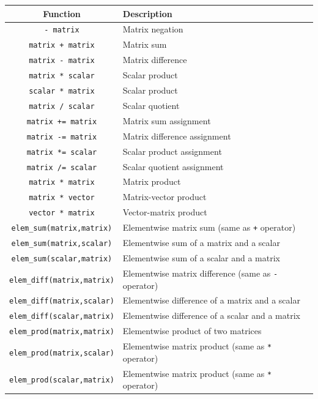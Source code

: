 \begin{table}[t!]\begin{centering}
\begin{tabular}{|c|l|} \hline
Function & Description \\ \hline \hline
\verb#- matrix# & Matrix negation \\ \hline
\verb#matrix + matrix# & Matrix sum \\ \hline
\verb#matrix - matrix# & Matrix difference \\ \hline
\verb#matrix * scalar# & Scalar product \\ \hline
\verb#scalar * matrix# & Scalar product \\ \hline
\verb#matrix / scalar# & Scalar quotient \\ \hline
\verb#matrix += matrix# & Matrix sum assignment \\ \hline
\verb#matrix -= matrix# & Matrix difference assignment \\ \hline
\verb#matrix *= scalar# & Scalar product assignment \\ \hline
\verb#matrix /= scalar# & Scalar quotient assignment \\ \hline
\hline
\verb#matrix * matrix# & Matrix product \\ \hline
\verb#matrix * vector# & Matrix-vector product \\ \hline
\verb#vector * matrix# & Vector-matrix product \\ \hline
\hline
\verb#elem_sum(matrix,matrix)# & Elementwise matrix sum (same as \verb#+# operator) \\ \hline
\verb#elem_sum(matrix,scalar)# & Elementwise sum of a matrix and a scalar \\ \hline
\verb#elem_sum(scalar,matrix)# & Elementwise sum of a scalar and a matrix \\ \hline
\verb#elem_diff(matrix,matrix)# & Elementwise matrix difference (same as \verb#-# operator) \\ \hline
\verb#elem_diff(matrix,scalar)# & Elementwise difference of a matrix and a scalar \\ \hline
\verb#elem_diff(scalar,matrix)# & Elementwise difference of a scalar and a matrix \\ \hline
\verb#elem_prod(matrix,matrix)# & Elementwise product of two matrices \\ \hline
\verb#elem_prod(matrix,scalar)# & Elementwise matrix product (same as \verb#*# operator) \\ \hline
\verb#elem_prod(scalar,matrix)# & Elementwise matrix product (same as \verb#*# operator) \\ \hline

\end{tabular}
\end{centering}
\end{table}
